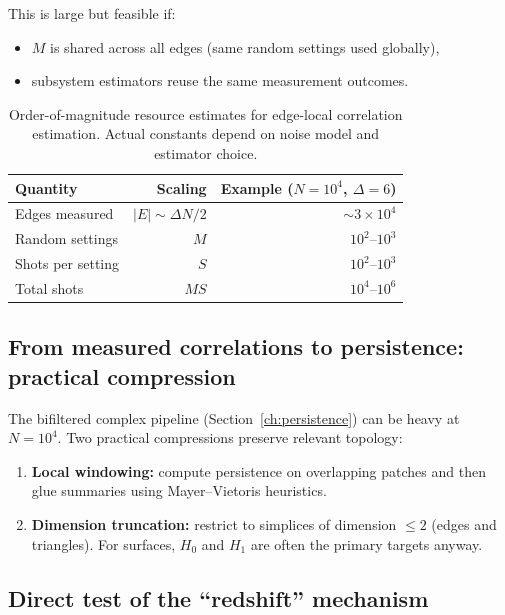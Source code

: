 \documentclass[11pt,oneside]{amsbook}
\numberwithin{equation}{section}
\theoremstyle{plain}
\theoremstyle{definition}
\theoremstyle{remark}
\begin{document}
This is large but feasible if:
\begin{itemize}
\item $M$ is shared across all edges (same random settings used globally),
\item subsystem estimators reuse the same measurement outcomes.
\end{itemize}

\begin{table}[h]
\centering
\begin{tabular}{@{}lrr@{}}
\toprule
Quantity & Scaling & Example ($N=10^4$, $\Delta=6$)\\
\midrule
Edges measured & $|E|\sim \Delta N/2$ & $\sim 3\times 10^4$\\
Random settings & $M$ & $10^2$--$10^3$\\
Shots per setting & $S$ & $10^2$--$10^3$\\
Total shots & $MS$ & $10^4$--$10^6$\\
\bottomrule
\end{tabular}
\caption{Order-of-magnitude resource estimates for edge-local correlation estimation. Actual constants depend on noise model and estimator choice.}
\label{tab:resources}
\end{table}

\subsection{From measured correlations to persistence: practical compression}
\label{sec:compression}

The bifiltered complex pipeline (Section~\ref{ch:persistence}) can be heavy at $N=10^4$.
Two practical compressions preserve relevant topology:

\begin{enumerate}
\item \textbf{Local windowing:} compute persistence on overlapping patches and then glue summaries using Mayer--Vietoris heuristics.
\item \textbf{Dimension truncation:} restrict to simplices of dimension $\le 2$ (edges and triangles).  For surfaces, $H_0$ and $H_1$ are often the primary targets anyway.
\end{enumerate}

\subsection{Direct test of the ``redshift'' mechanism}
\label{sec:redshift_test}
\end{document}
